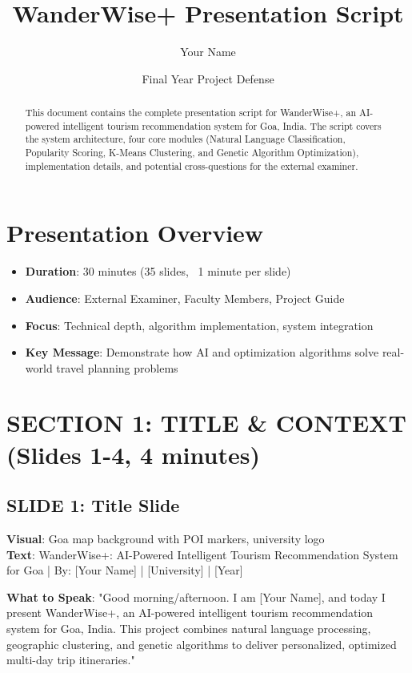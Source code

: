 \documentclass[12pt]{article}
\title{WanderWise+ Presentation Script}
\author[Your Name]{Your Name}
\date{Final Year Project Defense}
\begin{document}
\maketitle

\begin{abstract}
This document contains the complete presentation script for WanderWise+, an AI-powered intelligent tourism recommendation system for Goa, India. The script covers the system architecture, four core modules (Natural Language Classification, Popularity Scoring, K-Means Clustering, and Genetic Algorithm Optimization), implementation details, and potential cross-questions for the external examiner.
\end{abstract}

\section{Presentation Overview}
\begin{itemize}
    \item \textbf{Duration}: 30 minutes (35 slides, ~1 minute per slide)
    \item \textbf{Audience}: External Examiner, Faculty Members, Project Guide
    \item \textbf{Focus}: Technical depth, algorithm implementation, system integration
    \item \textbf{Key Message}: Demonstrate how AI and optimization algorithms solve real-world travel planning problems
\end{itemize}

\section{SECTION 1: TITLE \& CONTEXT (Slides 1-4, 4 minutes)}

\subsection{SLIDE 1: Title Slide}
\textbf{Visual}: Goa map background with POI markers, university logo \\
\textbf{Text}: WanderWise+: AI-Powered Intelligent Tourism Recommendation System for Goa | By: [Your Name] | [University] | [Year]

\textbf{What to Speak}:
"Good morning/afternoon. I am [Your Name], and today I present WanderWise+, an AI-powered intelligent tourism recommendation system for Goa, India. This project combines natural language processing, geographic clustering, and genetic algorithms to deliver personalized, optimized multi-day trip itineraries."
\end{document}
